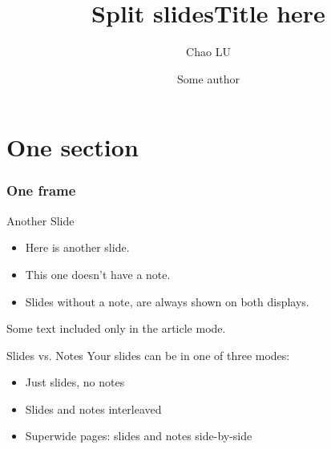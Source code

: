\usepackage[utf8]{inputenc}
\usepackage[T1]{fontenc}
\usepackage{fixltx2e}
\usepackage{graphicx}
\usepackage{longtable}
\usepackage{float}
\usepackage{wrapfig}
\usepackage{soul}
\usepackage{textcomp}
\usepackage{marvosym}
\usepackage{wasysym}
\usepackage{latexsym}
\usepackage{amssymb}
\usepackage{hyperref}
\usepackage{loochao}

\title{Split slides}
\author{Chao LU}
\date{}

\title{Title here}
\author{Some author}
\date{}



\begin{frame}
  \titlepage
\end{frame}


\section{One section}
\begin{frame}
  \frametitle{One frame}
\end{frame}

\begin{frame}{Another Slide}
  \begin{itemize}
  \item Here is another slide.
  \item This one doesn't have a note.
  \item Slides without a note, are always shown on both displays.
  \end{itemize}
\end{frame}

Some text included only in the article mode.

\begin{frame}{Slides vs.{} Notes}
  Your slides can be in one of three modes:
  \begin{itemize}
  \item Just slides, no notes
  \item Slides and notes interleaved
  \item Superwide pages: slides and notes side-by-side
  \end{itemize}
\end{frame}

